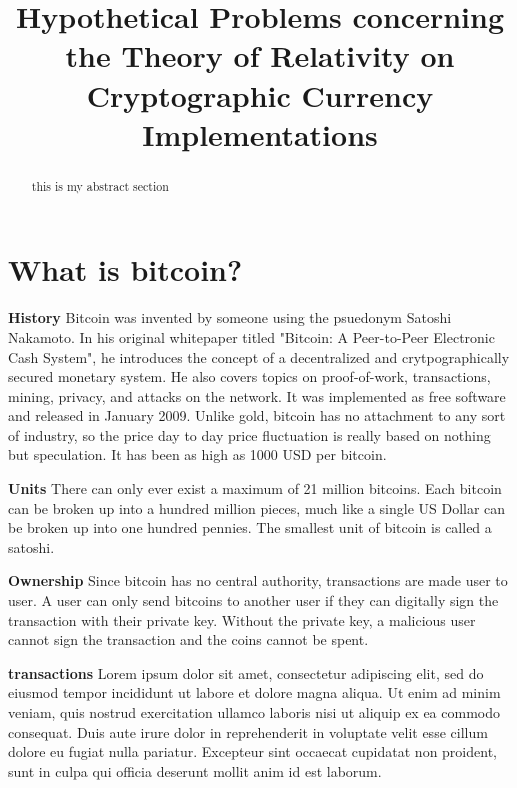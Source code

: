 \documentclass[conference]{IEEEtran}
\begin{document}
\title{Hypothetical Problems concerning the Theory of Relativity on Cryptographic Currency Implementations}
\author
{
}
\maketitle

\begin{abstract}
this is my abstract section
\end{abstract}

\section{What is bitcoin?}
\textbf{History} Bitcoin was invented by someone using the psuedonym Satoshi Nakamoto. In his original whitepaper titled "Bitcoin: A Peer-to-Peer Electronic Cash System", he introduces the concept of a decentralized and crytpographically secured monetary system. He also covers topics on proof-of-work, transactions, mining, privacy, and attacks on the network.\cite{nakamoto} It was implemented as free software and released in January 2009. Unlike gold, bitcoin has no attachment to any sort of industry, so the price day to day price fluctuation is really based on nothing but speculation. It has been as high as 1000 USD per bitcoin.\cite{1000usd}

\textbf{Units} There can only ever exist a maximum of 21 million bitcoins. Each bitcoin can be broken up into a hundred million pieces, much like a single US Dollar can be broken up into one hundred pennies. The smallest unit of bitcoin is called a satoshi.

\textbf{Ownership} Since bitcoin has no central authority, transactions are made user to user. A user can only send bitcoins to another user if they can digitally sign the transaction with their private key. Without the private key, a malicious user cannot sign the transaction and the coins cannot be spent. 

\textbf{transactions} Lorem ipsum dolor sit amet, consectetur adipiscing elit, sed do eiusmod tempor incididunt ut labore et dolore magna aliqua. Ut enim ad minim veniam, quis nostrud exercitation ullamco laboris nisi ut aliquip ex ea commodo consequat. Duis aute irure dolor in reprehenderit in voluptate velit esse cillum dolore eu fugiat nulla pariatur. Excepteur sint occaecat cupidatat non proident, sunt in culpa qui officia deserunt mollit anim id est laborum.
\end{document}

